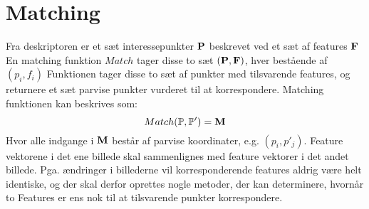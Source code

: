 \section{Matching}
Fra deskriptoren er et sæt interessepunkter $\bold{P}$ beskrevet ved et sæt af features $\bold{F}$ 
En matching funktion $Match$ tager disse to sæt $ (\bold{P},\bold{F})$, hver bestående af 
$ (p_i,f_i) $
Funktionen tager disse to sæt af punkter med tilsvarende features, og returnere et sæt parvise punkter vurderet til at korrespondere. Matching funktionen kan beskrives som:
\begin{equation}
Match(\mathbb{P}, \mathbb{P}') = \bold{M}
\end{equation}
Hvor alle indgange i $\bold{M}$ består af parvise koordinater, e.g. $(p_i, p'_j)$. Feature vektorene i det ene billede skal sammenlignes med feature vektorer i det andet billede. Pga. ændringer i billederne vil korresponderende features aldrig være helt identiske, og der skal derfor oprettes nogle metoder, der kan determinere, hvornår to Features er ens nok til at tilsvarende punkter korrespondere.